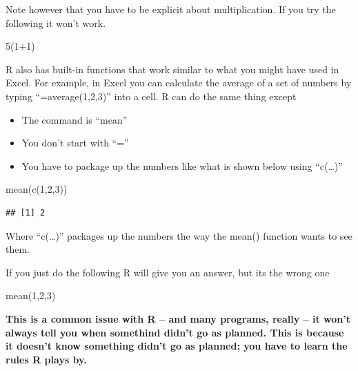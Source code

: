 \documentclass[
]{book}
\newenvironment{Shaded}{\begin{snugshade}}{\end{snugshade}}
\newcommand{\DecValTok}[1]{\textcolor[rgb]{0.00,0.00,0.81}{#1}}
\newcommand{\FunctionTok}[1]{\textcolor[rgb]{0.00,0.00,0.00}{#1}}
\newcommand{\NormalTok}[1]{#1}
\newcommand{\SpecialCharTok}[1]{\textcolor[rgb]{0.00,0.00,0.00}{#1}}
\providecommand{\tightlist}{%
  \setlength{\itemsep}{0pt}\setlength{\parskip}{0pt}}
\begin{document}
Note however that you have to be explicit about multiplication. If you try the following it won't work.

\begin{Shaded}
\begin{Highlighting}[]
\DecValTok{5}\NormalTok{(}\DecValTok{1}\SpecialCharTok{+}\DecValTok{1}\NormalTok{)}
\end{Highlighting}
\end{Shaded}

R also has built-in functions that work similar to what you might have used in Excel. For example, in Excel you can calculate the average of a set of numbers by typing ``=average(1,2,3)'' into a cell. R can do the same thing except

\begin{itemize}
\tightlist
\item
  The command is ``mean''
\item
  You don't start with ``=''
\item
  You have to package up the numbers like what is shown below using ``c(\ldots)''
\end{itemize}

\begin{Shaded}
\begin{Highlighting}[]
\FunctionTok{mean}\NormalTok{(}\FunctionTok{c}\NormalTok{(}\DecValTok{1}\NormalTok{,}\DecValTok{2}\NormalTok{,}\DecValTok{3}\NormalTok{))}
\end{Highlighting}
\end{Shaded}

\begin{verbatim}
## [1] 2
\end{verbatim}

Where ``c(\ldots)'' packages up the numbers the way the mean() function wants to see them.

If you just do the following R will give you an answer, but its the wrong one

\begin{Shaded}
\begin{Highlighting}[]
\FunctionTok{mean}\NormalTok{(}\DecValTok{1}\NormalTok{,}\DecValTok{2}\NormalTok{,}\DecValTok{3}\NormalTok{)}
\end{Highlighting}
\end{Shaded}

\textbf{This is a common issue with R -- and many programs, really -- it won't always tell you when somethind didn't go as planned. This is because it doesn't know something didn't go as planned; you have to learn the rules R plays by.}
\end{document}
